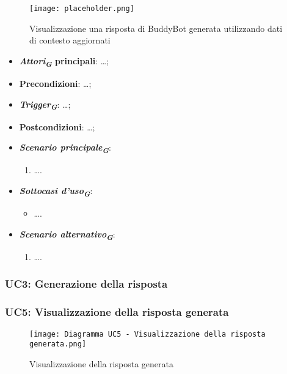 \begin{figure}[h]
    \centering
    \texttt{[image: placeholder.png]}
    \caption{Visualizzazione una risposta di BuddyBot generata utilizzando dati di contesto aggiornati}
\end{figure}

\begin{itemize}
    \item \textbf{\emph{Attori}\textsubscript{\textbf{\textit{G}}} principali}: \dots;
    \item \textbf{Precondizioni}: \dots;
    \item \textbf{\emph{Trigger}\textsubscript{\textbf{\textit{G}}}}: \dots;
    \item \textbf{Postcondizioni}: \dots;
    \item \textbf{\emph{Scenario principale}\textsubscript{\textbf{\textit{G}}}}:
    \begin{enumerate}
        \item \dots.
    \end{enumerate}
    \item \textbf{\emph{Sottocasi d'uso}\textsubscript{\textbf{\textit{G}}}}:
    \begin{itemize}
        \item \dots.
    \end{itemize}
    \item \textbf{\emph{Scenario alternativo}\textsubscript{\textbf{\textit{G}}}}:
    \begin{enumerate}
        \item \dots.
    \end{enumerate}
\end{itemize}



\hypertarget{UC3}{}
\subsubsection{UC3: Generazione della risposta}



\hypertarget{UC5}{}
\subsubsection{UC5: Visualizzazione della risposta generata}

\begin{figure}[h]
    \centering
    \texttt{[image: Diagramma UC5 - Visualizzazione della risposta generata.png]}
    \caption{Visualizzazione della risposta generata}
\end{figure}

